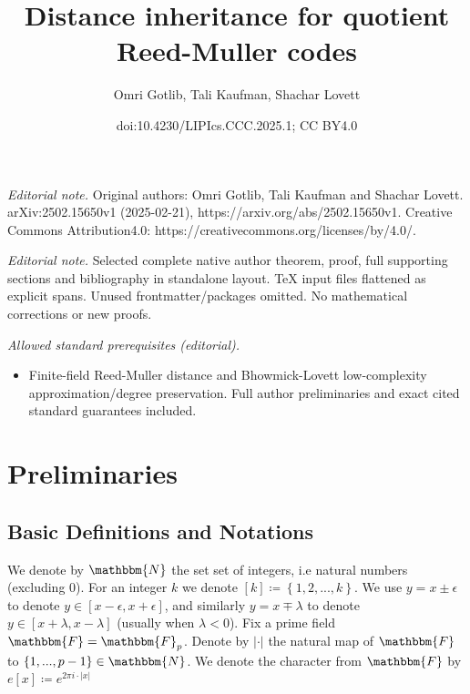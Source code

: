 \documentclass[10pt,a4paper]{article}
\title{Distance inheritance for quotient Reed-Muller codes}
\author{Omri Gotlib, Tali Kaufman, Shachar Lovett}
\date{doi:10.4230/LIPIcs.CCC.2025.1; CC BY4.0}
\newcommand{\definedas}[0]{\coloneqq}
\newcommand{\sparens}[1]{\left[ #1 \right]}
\newcommand{\set}[1]{\left\{ #1 \right\}}
\newcommand{\basefield}[0]{\mathbbm{F}}
\newcommand{\charfunc}[1]{e \sparens{#1}}
\newcommand{\genprime}[0]{p}
\newcommand{\naturalnumbersset}[0]{\mathbbm{N}}
\newcommand{\abs}[1]{\left| #1 \right|}
\begin{document}
\maketitle
\setcounter{section}{1}
\noindent\textit{Editorial note.} Original authors: Omri Gotlib, Tali Kaufman and Shachar Lovett. arXiv:2502.15650v1 (2025-02-21), https://arxiv.org/abs/2502.15650v1. Creative Commons Attribution4.0: https://creativecommons.org/licenses/by/4.0/.\par\medskip
\noindent\textit{Editorial note.} Selected complete native author theorem, proof, full supporting sections and bibliography in standalone layout. TeX input files flattened as explicit spans. Unused frontmatter/packages omitted. No mathematical corrections or new proofs.\par\medskip
\noindent\textit{Allowed standard prerequisites (editorial).}\begin{itemize}
\item Finite-field Reed-Muller distance and Bhowmick-Lovett low-complexity approximation/degree preservation. Full author preliminaries and exact cited standard guarantees included.
\end{itemize}\medskip
\section[Preliminaries]{Preliminaries}\label{sec:preliminaries}

\subsection{Basic Definitions and Notations}\label{subsec:definitions_and_notations}
We denote by $\naturalnumbersset$ the set set of integers, i.e natural numbers (excluding 0).
For an integer $k$ we denote $\sparens{k} \definedas \set{1,2,...,k}$.
We use $y = x \pm \epsilon$ to denote $y \in \sparens{x - \epsilon, x + \epsilon}$, and similarly $y = x \mp \lambda$ to denote $y \in \sparens{x + \lambda, x - \lambda}$ (usually when $\lambda < 0$).
\newline
Fix a prime field $\basefield = \basefield_{\genprime}$.
Denote by $\abs{\cdot}$ the natural map of $\basefield$ to $\set{1,...,\genprime - 1} \in \naturalnumbersset$.
We denote the character from $\basefield$ by $\charfunc{x} \definedas e^{2 \pi i \cdot \abs{x}}$
\end{document}
